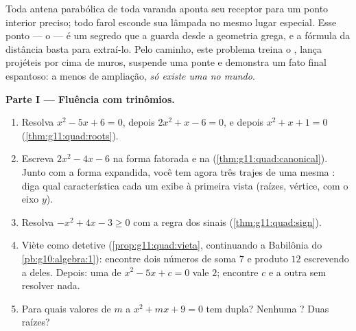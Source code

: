 \begin{problem}
\label{pb:g11:quad:1}
Toda antena parabólica de toda varanda aponta seu receptor para um
ponto interior preciso; todo farol esconde sua lâmpada no mesmo
lugar especial. Esse ponto --- o \emph{} --- é um segredo que
a  guarda desde a geometria grega, e a fórmula da
distância basta para extraí-lo. Pelo caminho, este problema treina
o , lança projéteis por cima de muros, suspende uma
ponte e demonstra um fato final espantoso: a menos de ampliação,
\emph{só existe uma  no mundo}.

\medskip
\noindent\textbf{Parte I --- Fluência com trinômios.}
\begin{enumerate}
  \item Resolva $x^2 - 5x + 6 = 0$, depois $2x^2 + x - 6 = 0$, e
        depois $x^2 + x + 1 = 0$ (\cref{thm:g11:quad:roots}).
  \item Escreva $2x^2 - 4x - 6$ na forma fatorada e na  (\cref{thm:g11:quad:canonical}). Junto com a
        forma expandida, você tem agora três trajes de uma mesma
        : diga qual característica cada um exibe à primeira
        vista (raízes, vértice,  com o eixo $y$).
  \item Resolva $-x^2 + 4x - 3 \geq 0$ com a regra dos sinais
        (\cref{thm:g11:quad:sign}).
  \item Viète como detetive (\cref{prop:g11:quad:vieta},
        continuando a Babilônia do \cref{pb:g10:algebra:1}):
        encontre dois números de soma $7$ e produto $12$
        escrevendo a  deles. Depois: uma  de
        $x^2 - 5x + c = 0$ vale $2$; encontre $c$ e a outra 
        sem resolver nada.
  \item Para quais valores de $m$ a  $x^2 + mx + 9 = 0$
        tem  dupla? Nenhuma ? Duas raízes?
\end{enumerate}


\end{problem}
